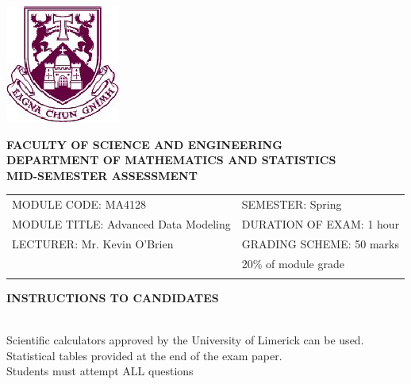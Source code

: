 \documentclass[a4paper,12pt]{article}
\begin{document}
\begin{center}
       \includegraphics[scale=0.55]{shieldtransparent2}
\end{center}

\begin{center}
\vspace{1cm}
\large \bf {FACULTY OF SCIENCE AND ENGINEERING} \\[0.5cm]
\normalsize DEPARTMENT OF MATHEMATICS AND STATISTICS \\[1.25cm]
\large \bf {MID-SEMESTER ASSESSMENT} \\[1.5cm]
\end{center}

\begin{tabular}{ll}
MODULE CODE: MA4128 & SEMESTER: Spring \\[1cm]
MODULE TITLE: Advanced Data Modeling & DURATION OF EXAM: 1 hour \\[1cm]
LECTURER: Mr. Kevin O'Brien & GRADING SCHEME: 50 marks \\
& \phantom{GRADING SCHEME:} \footnotesize {20\% of module grade} \\[0.8cm]
\\[1cm]
\end{tabular}
\begin{center}
{\bf INSTRUCTIONS TO CANDIDATES}
\end{center}

{\noindent \\ Scientific calculators approved by the University of Limerick can be used. \\
Statistical tables provided at the end of the exam paper.\\
Students must attempt ALL questions}
\newpage



\end{document}

